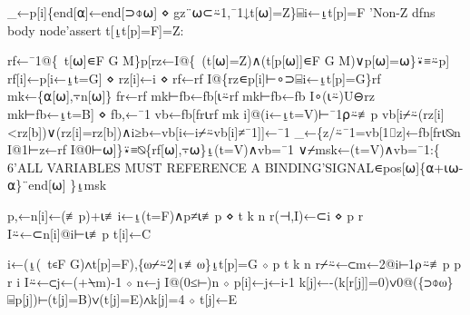 \documentclass{article}%
\begin{document}
\nwenddocs{}\endmoddef\nwstartdeflinemarkup{}\nwenddeflinemarkup
_←p[i]\{end[⍺]←end[⊃⌽⍵] ⋄ gz¨⍵⊂⍨1,¯1↓t[⍵]=Z\}⌸i←⍸t[p]=F
'Non-Z dfns body node'assert t[⍸t[p]=F]=Z:
\nwendcode{}\nwdocspar

\nwenddocs{}\endmoddef\nwstartdeflinemarkup{}\nwenddeflinemarkup
rf←¯1@\{~t[⍵]∊F G M\}p[rz←I@\{~(t[⍵]=Z)∧(t[p[⍵]]∊F G M)∨p[⍵]=⍵\}⍣≡⍨p]
rf[i]←p[i←⍸t=G] ⋄ rz[i]←i ⋄ rf←rf I@\{rz∊p[i]⊢∘⊃⌸i←⍸t[p]=G\}rf
mk←\{⍺[⍵],⍪n[⍵]\}
fr←rf mk⊢fb←fb[⍳⍨rf mk⊢fb←fb I∘(⍳⍨)U⊖rz mk⊢fb←⍸t=B] ⋄ fb,←¯1
vb←fb[fr⍳rf mk i]@(i←⍸t=V)⊢¯1⍴⍨≢p
vb[i⌿⍨(rz[i]<rz[b])∨(rz[i]=rz[b])∧i≥b←vb[i←i⌿⍨vb[i]≠¯1]]←¯1
_←\{z/⍨¯1=vb[1⌷z]←fb[fr⍳⍉n I@1⊢z←rf I@0⊢⍵]\}⍣≡⍉\{rf[⍵],⍪⍵\}⍸(t=V)∧vb=¯1
∨⌿msk←(t=V)∧vb=¯1:\{
        6'ALL VARIABLES MUST REFERENCE A BINDING'SIGNAL∊pos[⍵]\{⍺+⍳⍵-⍺\}¨end[⍵]
\}⍸msk
\nwendcode{}\nwdocspar

\nwenddocs{}\endmoddef\nwstartdeflinemarkup{}\nwenddeflinemarkup
p,←n[i]←(≢p)+⍳≢i←⍸(t=F)∧p≠⍳≢p ⋄ t k n r(⊣,I)←⊂i ⋄ p r I⍨←⊂n[i]@i⊢⍳≢p
t[i]←C
\nwendcode{}\nwdocspar

\nwenddocs{}\endmoddef\nwstartdeflinemarkup{}\nwenddeflinemarkup
i←(⍸(~t∊F G)∧t[p]=F),\{⍵⌿⍨2|⍳≢⍵\}⍸t[p]=G ⋄ p t k n r⌿⍨←⊂m←2@i⊢1⍴⍨≢p
p r i I⍨←⊂j←(+⍀m)-1 ⋄ n←j I@(0≤⊢)n ⋄ p[i]←j←i-1
k[j]←-(k[r[j]]=0)∨0@(\{⊃⌽⍵\}⌸p[j])⊢(t[j]=B)∨(t[j]=E)∧k[j]=4 ⋄ t[j]←E
\nwendcode{}\nwdocspar
\end{document}

